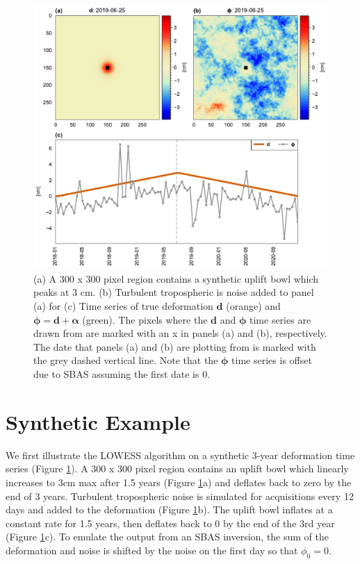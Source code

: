 \begin{figure}[!h]
	\centering
	\includegraphics[width=.99\textwidth]{figures/chapter5-lowess/figure2-demo-data.pdf}
	\caption[Synthetic data for LOWESS smoothing]{
		(a)  A 300 x 300 pixel region contains a synthetic uplift bowl which peaks at 3 cm.
		(b) Turbulent tropospheric is noise added to panel (a) for 
		(c) Time series of true deformation $\bm{d}$ (orange) and $\bm{\phi} =\bm{d} + \bm{\alpha}$ (green). The pixels where the $\bm{d}$ and $\bm{\phi}$ time series are drawn from are marked with an x in panels (a) and (b), respectively. The date that panels (a) and (b) are plotting from is marked with the grey dashed vertical line. Note that the $ \bm{\phi} $ time series is offset due to SBAS assuming the first date is $ 0 $.	
	}
	\label{fig:ch5-demo-data}
\end{figure}

\section{Synthetic Example}


We first illustrate the LOWESS algorithm on a synthetic 3-year deformation time series (Figure \ref{fig:ch5-demo-data}).
A 300 x 300 pixel region contains an uplift bowl which linearly increases to $ 3 $cm max after 1.5 years (Figure \ref{fig:ch5-demo-data}a) and deflates back to zero by the end of 3 years. Turbulent tropospheric noise is simulated for acquisitions every 12 days and added to the deformation (Figure \ref{fig:ch5-demo-data}b). The uplift bowl inflates at a constant rate for 1.5 years, then deflates back to 0 by the end of the 3rd year (Figure \ref{fig:ch5-demo-data}c).
To emulate the output from an SBAS inversion, the sum of the deformation and noise is shifted by the noise on the first day so that $ \phi_0 = 0 $.




